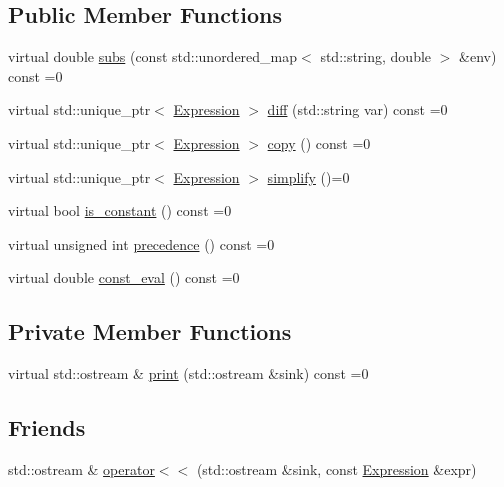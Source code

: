 \subsection*{Public Member Functions}
\begin{DoxyCompactItemize}
\item 
virtual double \mbox{\hyperlink{classsymcpp_1_1Expression_aaef29b0afa2d6c21fe35f47a1be76134}{subs}} (const std\+::unordered\+\_\+map$<$ std\+::string, double $>$ \&env) const =0
\item 
virtual std\+::unique\+\_\+ptr$<$ \mbox{\hyperlink{classsymcpp_1_1Expression}{Expression}} $>$ \mbox{\hyperlink{classsymcpp_1_1Expression_a032fe8da79d5e231ca2d21a201c8f32d}{diff}} (std\+::string var) const =0
\item 
virtual std\+::unique\+\_\+ptr$<$ \mbox{\hyperlink{classsymcpp_1_1Expression}{Expression}} $>$ \mbox{\hyperlink{classsymcpp_1_1Expression_a2e7de5a295ccf0efdc9b34cea7ba3d0b}{copy}} () const =0
\item 
virtual std\+::unique\+\_\+ptr$<$ \mbox{\hyperlink{classsymcpp_1_1Expression}{Expression}} $>$ \mbox{\hyperlink{classsymcpp_1_1Expression_ab1fa6e55eea0682250d013f28db26cd2}{simplify}} ()=0
\item 
virtual bool \mbox{\hyperlink{classsymcpp_1_1Expression_a30db7917c8948e22330cbe8259caeae2}{is\+\_\+constant}} () const =0
\item 
virtual unsigned int \mbox{\hyperlink{classsymcpp_1_1Expression_a181c162d5740faac392ffdca26bfca0c}{precedence}} () const =0
\item 
virtual double \mbox{\hyperlink{classsymcpp_1_1Expression_a81c8069347f586cb5632338d97c278ad}{const\+\_\+eval}} () const =0
\end{DoxyCompactItemize}
\subsection*{Private Member Functions}
\begin{DoxyCompactItemize}
\item 
virtual std\+::ostream \& \mbox{\hyperlink{classsymcpp_1_1Expression_af37e13032a40f2da4d2866eaa8658049}{print}} (std\+::ostream \&sink) const =0
\end{DoxyCompactItemize}
\subsection*{Friends}
\begin{DoxyCompactItemize}
\item 
std\+::ostream \& \mbox{\hyperlink{classsymcpp_1_1Expression_ade0d81d94acc2274ae8657f14d5636fe}{operator$<$$<$}} (std\+::ostream \&sink, const \mbox{\hyperlink{classsymcpp_1_1Expression}{Expression}} \&expr)
\end{DoxyCompactItemize}


